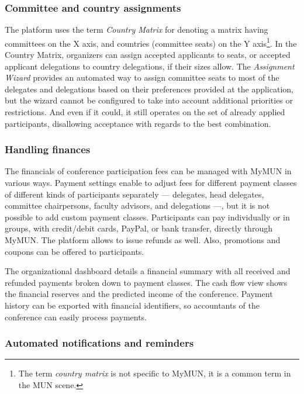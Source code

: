 \subsubsection{Committee and country assignments}

The platform uses the term \emph{Country Matrix} for denoting a matrix having committees on the X axis, and countries (committee seats) on the Y axis\footnote{The term \emph{country matrix} is not specific to MyMUN, it is a common term in the MUN scene.}. In the Country Matrix, organizers can assign accepted applicants to seats, or accepted applicant delegations to country delegations, if their sizes allow. The \emph{Assignment Wizard} provides an automated way to assign committee seats to most of the delegates and delegations based on their preferences provided at the application, but the wizard cannot be configured to take into account additional priorities or restrictions. And even if it could, it still operates on the set of already applied participants, disallowing acceptance with regards to the best combination.

\subsubsection{Handling finances}

The financials of conference participation fees can be managed with MyMUN in various ways. Payment settings enable to adjust fees for different payment classes of different kinds of participants separately — delegates, head delegates, committee chairpersons, faculty advisors, and delegations —, but it is not possible to add custom payment classes. Participants can pay individually or in groups, with credit/debit cards, PayPal, or bank transfer, directly through MyMUN. The platform allows to issue refunds as well. Also, promotions and coupons can be offered to participants.

The organizational dashboard details a financial summary with all received and refunded payments broken down to payment classes. The cash flow view shows the financial reserves and the predicted income of the conference. Payment history can be exported with financial identifiers, so accountants of the conference can easily process payments.

\subsubsection{Automated notifications and reminders}

